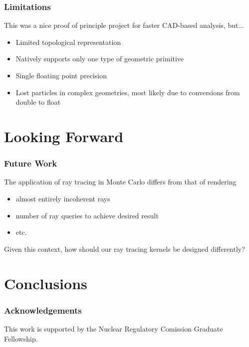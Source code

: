 \documentclass[12pt]{beamer}
\begin{document}
\begin{frame}
\frametitle{Limitations}

This was a nice proof of principle project for faster CAD-based analysis, but... \\
\vfill
\begin{itemize}
\item Limited topological representation
\item Natively supports only one type of geometric primitive
\item Single floating point precision
\item Lost particles in complex geometries, most likely due to conversions from double to float
\end{itemize}
\end{frame}

\section{Looking Forward} %

\begin{frame}

\frametitle{Future Work}

\vfill
The application of ray tracing in Monte Carlo differs from that of rendering
  \begin{itemize}
    \item almost entirely incoherent rays
    \item number of ray queries to achieve desired result
    \item etc.
  \end{itemize}
\vfill
Given this context, how should our ray tracing kernels be designed differently?

\end{frame}


\section{Conclusions}

\begin{frame}
  \frametitle{Acknowledgements}
  \begin{center}
    This work is supported by the Nuclear Regulatory Comission Graduate Fellowship.
    \end{center}
  \end{frame}
\end{document}
